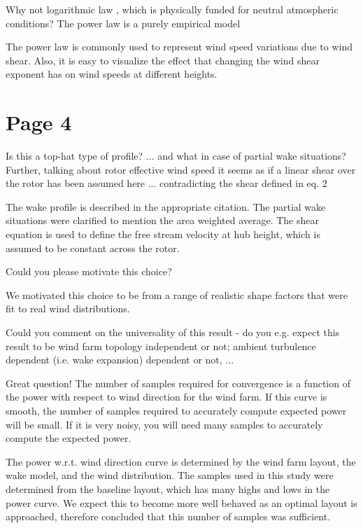 \documentclass[12pt]{report}
\begin{document}
\bigskip \color{black}
Why not logarithmic law , which is physically funded for neutral atmospheric conditions? The power law is a purely empirical model

\color{blue} The power law is commonly used to represent wind speed variations due to wind shear. Also, it is easy to visualize the effect that changing the wind shear exponent has on wind speeds at different heights.

\bigskip \color{black}
\section*{Page 4}
\bigskip \color{black}
Is this a top-hat type of profile? ... and what in case of partial wake situations?
Further, talking about rotor effective wind speed it seems as if a linear shear over the rotor has been assumed here ... contradicting the shear defined in eq. 2

\color{blue} The wake profile is described in the appropriate citation. The partial wake situations were clarified to mention the area weighted average. The shear equation is used to define the free stream velocity at hub height, which is assumed to be constant across the rotor.

\bigskip \color{black}
Could you please motivate this choice?

\color{blue} We motivated this choice to be from a range of realistic shape factors that were fit to real wind distributions.

\bigskip \color{black}
Could you comment on the universality of this result - do you e.g. expect this result to be wind farm topology independent or not; ambient turbulence dependent (i.e. wake expansion) dependent or not, ... 

\color{blue} Great question! The number of samples required for convergence is a function of the power with respect to wind direction for the wind farm. If this curve is smooth, the number of samples required to accurately compute expected power will be small. If it is very noisy, you will need many samples to accurately compute the expected power. 

The power w.r.t. wind direction curve is determined by the wind farm layout, the wake model, and the wind distribution. The samples used in this study were determined from the baseline layout, which has many highs and lows in the power curve. We expect this to become more well behaved as an optimal layout is approached, therefore concluded that this number of samples was sufficient. 
\end{document}
